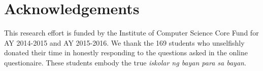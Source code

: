 \documentclass[a4paper,a4paper,BCOR12mm,12pt,abstracton,pointednumbers,tablecaptionabove,footinclude,halfparskip,normalheadings,]{scrartcl}
\begin{document}
\section*{Acknowledgements}

This research effort is funded by the Institute of Computer Science Core Fund for AY 2014-2015 and AY 2015-2016. We thank the 169 students who unselfishly donated their time in honestly responding to the questions asked in the online questionaire. These students embody the true {\em iskolar ng bayan para sa bayan}.



\end{document}
